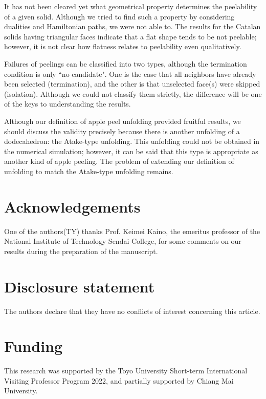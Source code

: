 \documentclass[]{interact}
\theoremstyle{plain}%
\theoremstyle{definition}
\theoremstyle{remark}
\begin{document}
It has not been cleared yet what geometrical property determines the peelability of a given solid. Although we tried to find such a property by considering dualities and Hamiltonian paths, we were not able to. 
The results for the Catalan solids having triangular faces indicate that a flat shape tends to be not peelable; however, it is not clear how flatness relates to peelability even qualitatively.

Failures of peelings can be classified into two types, although the termination condition is only ``no candidate". One is the case that all neighbors have already been selected (termination), and the other is that unselected face(s) were skipped (isolation). Although we could not classify them strictly, the difference will be one of the keys to understanding the results. 



Although our definition of apple peel unfolding provided fruitful results, we should discuss the validity precisely because there is another unfolding of a dodecahedron: the Atake-type unfolding. This unfolding could not be obtained in the numerical simulation; however, it can be said that this type is appropriate as another kind of apple peeling. The problem of extending our definition of unfolding to match the Atake-type unfolding remains. 


\section*{Acknowledgements}
One of the authors(TY) thanks Prof. Keimei Kaino, the emeritus professor of the National Institute of Technology Sendai College, for some comments on our results during the preparation of the manuscript. 

\section*{Disclosure statement}
The authors declare that they have no conflicts of interest concerning this article.


\section*{Funding}
This research was supported by the Toyo University Short-term International Visiting Professor Program 2022, and partially supported by Chiang Mai University.
\end{document}

